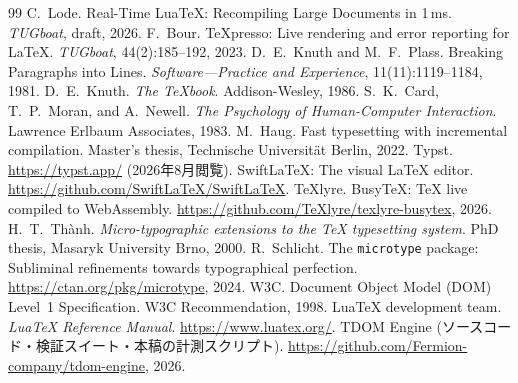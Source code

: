 \documentclass[a4paper,11pt]{ltjsarticle}
\newcommand{\tdom}{TDOM}
\newcommand{\code}[1]{\texttt{#1}}
\begin{document}
\begin{thebibliography}{99}\small
{} C.~Lode.
  Real-Time LuaTeX: Recompiling Large Documents in 1\,ms.
  \emph{TUGboat}, draft, 2026.
 F.~Bour.
  TeXpresso: Live rendering and error reporting for \LaTeX.
  \emph{TUGboat}, 44(2):185--192, 2023.
 D.~E.~Knuth and M.~F.~Plass.
  Breaking Paragraphs into Lines.
  \emph{Software---Practice and Experience}, 11(11):1119--1184, 1981.
 D.~E.~Knuth.
  \emph{The \TeX book}. Addison-Wesley, 1986.
 S.~K.~Card, T.~P.~Moran, and A.~Newell.
  \emph{The Psychology of Human-Computer Interaction}.
  Lawrence Erlbaum Associates, 1983.
 M.~Haug.
  Fast typesetting with incremental compilation.
  Master's thesis, Technische Universit\"at Berlin, 2022.
 Typst. \url{https://typst.app/} (2026年8月閲覧).
 SwiftLaTeX: The visual \LaTeX{} editor.
  \url{https://github.com/SwiftLaTeX/SwiftLaTeX}.
 TeXlyre. BusyTeX: \TeX{} live compiled to WebAssembly.
  \url{https://github.com/TeXlyre/texlyre-busytex}, 2026.
 H.~T.~Th\`anh.
  \emph{Micro-typographic extensions to the \TeX{} typesetting system}.
  PhD thesis, Masaryk University Brno, 2000.
 R.~Schlicht.
  The \code{microtype} package: Subliminal refinements towards typographical perfection.
  \url{https://ctan.org/pkg/microtype}, 2024.
 W3C.
  Document Object Model (DOM) Level~1 Specification.
  W3C Recommendation, 1998.
 LuaTeX development team.
  \emph{LuaTeX Reference Manual}. \url{https://www.luatex.org/}.
 \tdom{} Engine (ソースコード・検証スイート・本稿の計測スクリプト).
  \url{https://github.com/Fermion-company/tdom-engine}, 2026.
\end{thebibliography}
\end{document}
